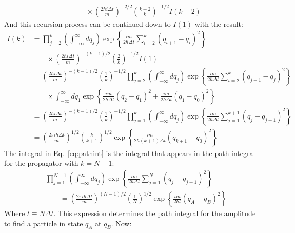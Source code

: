 \documentclass[12pt,a4]{article}
\begin{document}
\begin{enumerate}
\begin{align*}
           &\qquad \times \left(\frac{2 \hbar i \Delta t}{m}\right)^{-2/2}\left( \frac{k - 2}{k}\right)^{-1/2} I(k - 2)
    \end{align*}
    And this recursion process can be continued down to $I(1)$ with the result:
    \begin{align}
      I(k) &= \prod_{j = 2}^{k}\left(\int_{-\infty}^\infty dq_j\right) \exp\left\{\frac{im}{2\hbar \Delta t}\sum_{i = 2}^{k}\left(q_{i+1} - q_{i}\right)^2 \right\} \nonumber\\
           &\qquad \times \left(\frac{2 \hbar i \Delta t}{m}\right)^{-(k - 1)/2}\left( \frac{2}{k}\right)^{-1/2} I(1) \nonumber \\
           &= \left(\frac{2 \hbar i \Delta t}{m}\right)^{-(k - 1)/2}\left(\frac{1}{k}\right)^{-1/2} \prod_{j = 2}^{k}\left(\int_{-\infty}^\infty dq_j\right) \exp\left\{\frac{im}{2\hbar \Delta t}\sum_{i = 2}^{k}\left(q_{j+1} - q_{j}\right)^2 \right\} \nonumber\\
           &\qquad \times \int_{-\infty}^\infty dq_1 \exp\left\{\frac{im}{2\hbar \Delta t}\left(q_{2} - q_{1}\right)^2 + \frac{im}{2\hbar \Delta t}\left(q_{1} - q_{0}\right)^2\right\} \nonumber\\
           &= \left(\frac{2 \hbar i \Delta t}{m}\right)^{-(k - 1)/2}\left(\frac{1}{k}\right)^{-1/2} \prod_{j = 1}^{k}\left(\int_{-\infty}^\infty dq_j\right) \exp\left\{\frac{im}{2\hbar \Delta t}\sum_{j = 1}^{k + 1}\left(q_{j} - q_{j - 1}\right)^2 \right\}\label{eq:pathint}\\
           &=\left(\frac{2 \pi i \hbar  \Delta t}{ m }\right)^{1/2}\left(\frac{k}{k+1}\right)^{1/2}\exp\left\{\frac{im}{2 \hbar  (k + 1) \Delta t}\left(q_{k + 1} - q_{0}\right)^2\right\} \nonumber
    \end{align}
    The integral in Eq.~\ref{eq:pathint} is the integral that appears in the path integral for the propagator with $k = N-1$:
    \begin{align*}
      &\prod_{j = 1}^{N - 1}\left(\int_{-\infty}^\infty dq_j\right) \exp\left\{\frac{im}{2\hbar \Delta t}\sum_{j = 1}^{N}\left(q_{j} - q_{j - 1}\right)^2 \right\} \\
      &\qquad =  \left(\frac{2 \pi i \hbar  \Delta t}{ m }\right)^{(N - 1)/2} \left(\frac{1}{N}\right)^{1/2}\exp\left\{\frac{im}{2 \hbar  t}\left(q_{A} - q_{B}\right)^2\right\} \nonumber
    \end{align*}
    Where $t \equiv N \Delta t$. This expression determines the path integral for the amplitude to find a particle in state $q_A$ at $q_B$.
    Now:
    \begin{align*}

\end{align*}
\end{enumerate}
\end{document}
